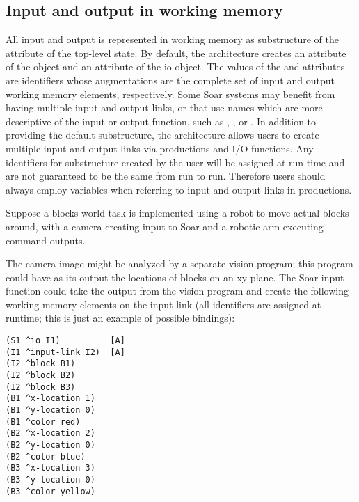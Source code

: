 \subsection{Input and output in working memory}
\label{ADVANCED-io-wm}

All input and output is represented in working memory as substructure of the
 attribute of the top-level state.  By default, the architecture
creates an  attribute of the  object and
an  attribute of the io object. 
The values of the  and  attributes
are identifiers whose augmentations are the complete set of input and
output working memory elements, respectively.  Some Soar systems may 
benefit from having multiple input and output links, or that use names
which are more
descriptive of the input or output function, such as ,
, or .  In addition to
providing  the default  substructure, the architecture allows
users to create multiple input and output links via productions
and I/O functions.  Any identifiers for  substructure created
by the user will be assigned at run time and are not guaranteed to be
the same from run to run.  Therefore users should always employ
variables when referring to input and output links in productions.

Suppose a blocks-world task is implemented using a robot to move
actual blocks around, with a camera creating input to Soar and a robotic arm
executing command outputs. 
\begin{figure}
\label{fig:blocks-inputlink}
\end{figure}
The camera image might be analyzed by a separate vision program; this program
could have as its output the locations of blocks on an xy plane.  
The Soar input function could take the
output from the vision program and create the following working memory
elements on the input link (all identifiers are assigned at runtime; 
this is just an example of possible bindings):

\begin{verbatim}
(S1 ^io I1)          [A]
(I1 ^input-link I2)  [A]
(I2 ^block B1)
(I2 ^block B2)
(I2 ^block B3)
(B1 ^x-location 1)
(B1 ^y-location 0)
(B1 ^color red)
(B2 ^x-location 2)
(B2 ^y-location 0)
(B2 ^color blue)
(B3 ^x-location 3)
(B3 ^y-location 0)
(B3 ^color yellow)
\end{verbatim} \vspace{12pt}

